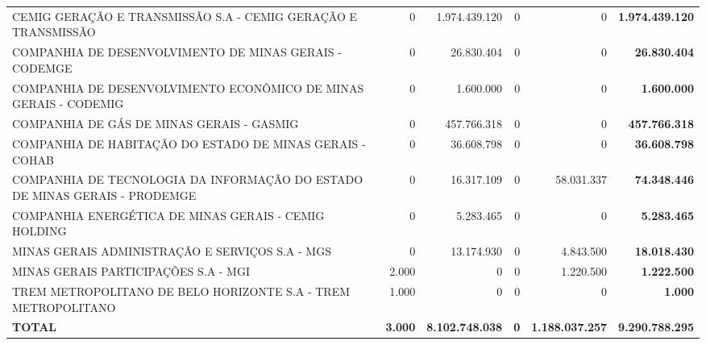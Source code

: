\documentclass{article}
\begin{document}
\begin{longtable}[c]{m{5cm}|m{2.5cm}|m{2.5cm}|m{2.5cm}|m{2cm}|m{2cm}}
\multicolumn{1}{L{5cm}|}{CEMIG GERAÇÃO E TRANSMISSÃO S.A - CEMIG GERAÇÃO E TRANSMISSÃO} & \multicolumn{1}{r|}{    0} & \multicolumn{1}{r|}{1.974.439.120} & \multicolumn{1}{r|}{0} & \multicolumn{1}{r|}{            0} & \multicolumn{1}{r}{ \textbf{1.974.439.120}} \\
\multicolumn{1}{L{5cm}|}{COMPANHIA DE DESENVOLVIMENTO DE MINAS GERAIS - CODEMGE} & \multicolumn{1}{r|}{    0} & \multicolumn{1}{r|}{26.830.404} & \multicolumn{1}{r|}{0} & \multicolumn{1}{r|}{            0} & \multicolumn{1}{r}{ \textbf{26.830.404}} \\
\multicolumn{1}{L{5cm}|}{COMPANHIA DE DESENVOLVIMENTO ECONÔMICO DE MINAS GERAIS - CODEMIG} & \multicolumn{1}{r|}{    0} & \multicolumn{1}{r|}{1.600.000} & \multicolumn{1}{r|}{0} & \multicolumn{1}{r|}{            0} & \multicolumn{1}{r}{ \textbf{1.600.000}} \\
\multicolumn{1}{L{5cm}|}{COMPANHIA DE GÁS DE MINAS GERAIS - GASMIG} & \multicolumn{1}{r|}{    0} & \multicolumn{1}{r|}{457.766.318} & \multicolumn{1}{r|}{0} & \multicolumn{1}{r|}{            0} & \multicolumn{1}{r}{ \textbf{457.766.318}} \\
\multicolumn{1}{L{5cm}|}{COMPANHIA DE HABITAÇÃO DO ESTADO DE MINAS GERAIS - COHAB} & \multicolumn{1}{r|}{    0} & \multicolumn{1}{r|}{36.608.798} & \multicolumn{1}{r|}{0} & \multicolumn{1}{r|}{            0} & \multicolumn{1}{r}{ \textbf{36.608.798}} \\
\multicolumn{1}{L{5cm}|}{COMPANHIA DE TECNOLOGIA DA INFORMAÇÃO DO ESTADO DE MINAS GERAIS - PRODEMGE} & \multicolumn{1}{r|}{    0} & \multicolumn{1}{r|}{16.317.109} & \multicolumn{1}{r|}{0} & \multicolumn{1}{r|}{58.031.337} & \multicolumn{1}{r}{ \textbf{74.348.446}} \\
\multicolumn{1}{L{5cm}|}{COMPANHIA ENERGÉTICA DE MINAS GERAIS - CEMIG HOLDING} & \multicolumn{1}{r|}{    0} & \multicolumn{1}{r|}{5.283.465} & \multicolumn{1}{r|}{0} & \multicolumn{1}{r|}{            0} & \multicolumn{1}{r}{ \textbf{5.283.465}} \\
\multicolumn{1}{L{5cm}|}{MINAS GERAIS ADMINISTRAÇÃO E SERVIÇOS S.A - MGS} & \multicolumn{1}{r|}{    0} & \multicolumn{1}{r|}{13.174.930} & \multicolumn{1}{r|}{0} & \multicolumn{1}{r|}{4.843.500} & \multicolumn{1}{r}{ \textbf{18.018.430}} \\
\multicolumn{1}{L{5cm}|}{MINAS GERAIS PARTICIPAÇÕES S.A - MGI} & \multicolumn{1}{r|}{2.000} & \multicolumn{1}{r|}{            0} & \multicolumn{1}{r|}{0} & \multicolumn{1}{r|}{1.220.500} & \multicolumn{1}{r}{ \textbf{1.222.500}} \\
\multicolumn{1}{L{5cm}|}{TREM METROPOLITANO DE BELO HORIZONTE S.A - TREM METROPOLITANO} & \multicolumn{1}{r|}{1.000} & \multicolumn{1}{r|}{            0} & \multicolumn{1}{r|}{0} & \multicolumn{1}{r|}{            0} & \multicolumn{1}{r}{ \textbf{1.000}} \\
\hline
\multicolumn{1}{L{5cm}|}{ \textbf{TOTAL}} & \multicolumn{1}{r|}{ \textbf{3.000}} & \multicolumn{1}{r|}{ \textbf{8.102.748.038}} & \multicolumn{1}{r|}{ \textbf{0}} & \multicolumn{1}{r|}{ \textbf{1.188.037.257}} & \multicolumn{1}{r}{ \textbf{9.290.788.295}} \\
\end{longtable}
\end{document}

